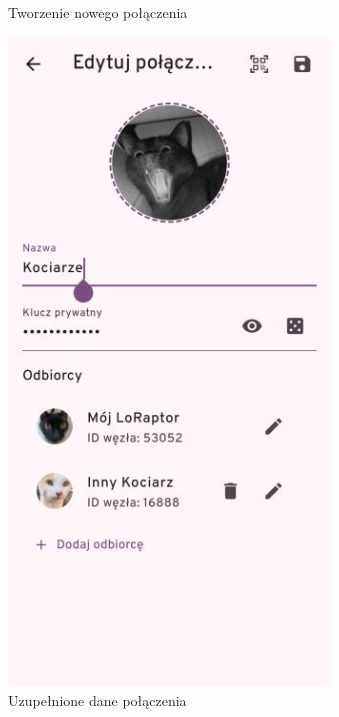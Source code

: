 \begin{figure}[H]
\begin{minipage}[b]{0.45\textwidth}
		\caption{Tworzenie nowego połączenia}
	\end{minipage}
	\hfill
	\begin{minipage}[b]{0.45\textwidth}
		\centering
		\includegraphics[width=\textwidth]{root/raptchat_edit_connection_completed.png}
		\caption{Uzupełnione dane połączenia}
	\end{minipage}
\end{figure}

